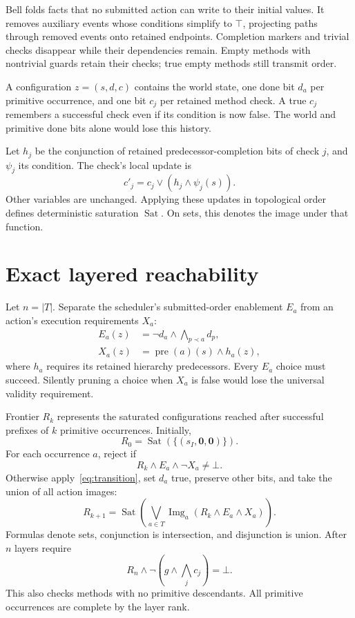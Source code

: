 \documentclass[10pt,a4paper,twocolumn]{article}
\newcommand{\pre}{\operatorname{pre}}
\begin{document}
Bell folds facts that no submitted action can write to their initial values.
It removes auxiliary events whose conditions simplify to $\top$, projecting
paths through removed events onto retained endpoints. Completion markers and
trivial checks disappear while their dependencies remain. Empty methods with
nontrivial guards retain their checks; true empty methods still transmit order.

A configuration $z=(s,d,c)$ contains the world state, one done bit $d_a$ per
primitive occurrence, and one bit $c_j$ per retained method check. A true $c_j$
remembers a successful check even if its condition is now false. The world and
primitive done bits alone would lose this history.

Let $h_j$ be the conjunction of retained predecessor-completion bits of check
$j$, and $\psi_j$ its condition. The check's local update is
\begin{equation}\label{eq:check}
 c'_j=c_j\lor(h_j\land\psi_j(s)).
\end{equation}
Other variables are unchanged. Applying these updates in topological order
defines deterministic saturation $\operatorname{Sat}$. On sets, this denotes
the image under that function.

\section{Exact layered reachability}
Let $n=|T|$. Separate the scheduler's submitted-order enablement $E_a$ from an
action's execution requirements $X_a$:
\begin{align}
 E_a(z)&=\neg d_a\land\bigwedge_{p\prec a}d_p,\label{eq:enabled}\\
 X_a(z)&=\pre(a)(s)\land h_a(z),\label{eq:executable}
\end{align}
where $h_a$ requires its retained hierarchy predecessors. Every $E_a$ choice
must succeed. Silently pruning a choice when $X_a$ is false would lose the
universal validity requirement.

Frontier $R_k$ represents the saturated configurations reached after successful
prefixes of $k$ primitive occurrences. Initially,
\[
 R_0=\operatorname{Sat}(\{(s_I,\mathbf{0},\mathbf{0})\}).
\]
For each occurrence $a$, reject if
\begin{equation}\label{eq:bad}
 R_k\land E_a\land\neg X_a\ne\bot.
\end{equation}
Otherwise apply~\eqref{eq:transition}, set $d_a$ true, preserve other bits,
and take the union of all action images:
\begin{equation}\label{eq:layer}
 R_{k+1}=\operatorname{Sat}\left(\bigvee_{a\in T}
 \operatorname{Img}_a(R_k\land E_a\land X_a)\right).
\end{equation}
Formulas denote sets, conjunction is intersection, and disjunction is union.
After $n$ layers require
\begin{equation}\label{eq:final}
 R_n\land\neg\left(g\land\bigwedge_j c_j\right)=\bot.
\end{equation}
This also checks methods with no primitive descendants. All primitive
occurrences are complete by the layer rank.
\end{document}
